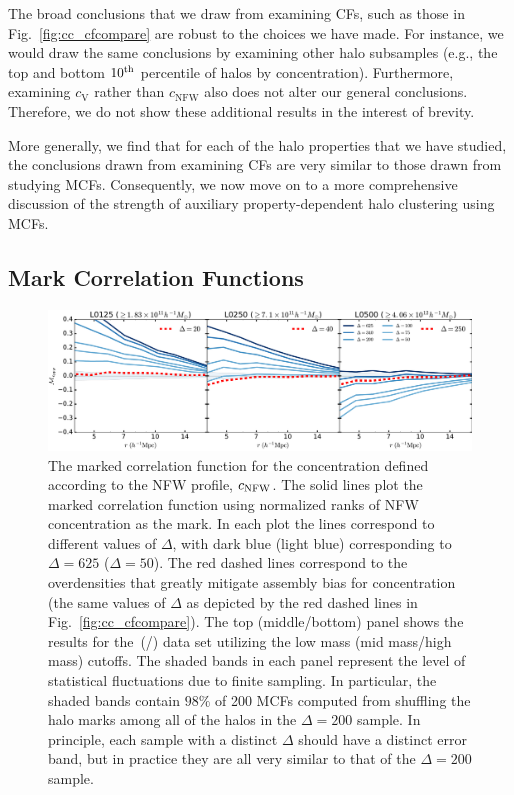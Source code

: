 \documentclass[usenatbib,fleqn]{mnras}
\begin{document}
The broad conclusions that we draw from examining CFs, such as those in Fig.~\ref{fig:cc_cfcompare} are robust to the choices we have made. For instance, we would draw the same conclusions by examining other halo subsamples (e.g., the top and bottom $10^{\rm{th}}$ percentile of halos by concentration). Furthermore, examining $c_{\mathrm{V}}$ rather than $c_{\mathrm{NFW}}$ also does not alter our general conclusions. Therefore, we do not show these additional results in the interest of brevity.

More generally, we find that for each of the halo properties that we have studied, the conclusions drawn from examining CFs are very similar to those drawn from studying MCFs. Consequently, we now move on to a more comprehensive discussion of the strength of auxiliary property-dependent halo clustering using MCFs. 

\subsection{Mark Correlation Functions}
\label{sub:mcfresults}

\begin{figure}
	\centering
	\includegraphics[width=\textwidth]{all_mcf_cNFW.pdf}
	\caption{
The marked correlation function for the concentration defined according to the NFW profile, $c_{\rm NFW}$. The solid lines plot the marked correlation function using normalized ranks of NFW concentration as the mark. In each plot the lines correspond to different values of $\Delta$, with dark blue (light blue) corresponding to $\Delta = 625$ ($\Delta = 50$). The red dashed lines correspond to the overdensities that greatly mitigate assembly bias for concentration (the same values of $\Delta$ as depicted by the red dashed lines in Fig.~\ref{fig:cc_cfcompare}). The top (middle/bottom) panel shows the results for the\simA \ (\simB /\simC) data set utilizing the low mass (mid mass/high mass) cutoffs. The shaded bands in each panel represent the level of statistical fluctuations due to finite sampling. In particular, the shaded bands contain $98\%$ of 200 MCFs computed from shuffling the halo marks among all of the halos in the $\Delta=200$ sample. In principle, each sample with a distinct $\Delta$ should have a distinct error band, but in practice they are all very similar to that of the $\Delta=200$ sample.
}
	\label{fig:cc_mcf_cnfw}
\end{figure}
\end{document}
